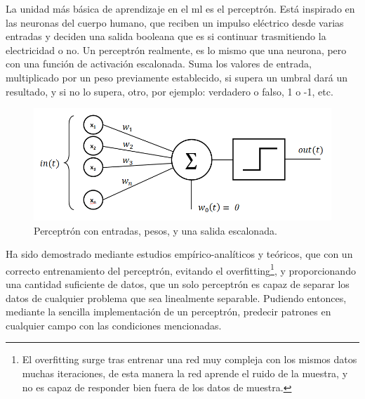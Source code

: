 La unidad más básica de aprendizaje en el \gls{ml} es el perceptrón. Está inspirado en las neuronas del cuerpo humano, que reciben un impulso eléctrico desde varias entradas y deciden una salida booleana que es si continuar trasmitiendo la electricidad o no. 
Un perceptrón realmente, es lo mismo que una neurona, pero con una función de activación escalonada. Suma los valores de entrada, multiplicado por un peso previamente establecido, si supera un umbral dará un resultado, y si no lo supera, otro, por ejemplo: verdadero o falso, 1 o -1, etc.

\begin{figure}[h]
	\centering
	\includegraphics[width=15cm]{archivos/imagenes/perceptron.png}
	\caption[Perceptrón con entradas, pesos, y una salida escalonada.]{Perceptrón con entradas, pesos, y una salida escalonada\footnotemark.}
	\label{perceptron}
\end{figure}

Ha sido demostrado mediante estudios empírico-analíticos y teóricos, que con un correcto entrenamiento del perceptrón, evitando el overfitting\footnote{El overfitting surge tras entrenar una red muy compleja con los mismos datos muchas iteraciones, de esta manera la red aprende el ruido de la muestra, y no es capaz de responder bien fuera de los datos de muestra.}, y proporcionando una cantidad suficiente de datos, que un solo perceptrón es capaz de separar los datos de cualquier problema que sea linealmente separable. Pudiendo entonces, mediante la sencilla implementación de un perceptrón, predecir patrones en cualquier campo con las condiciones mencionadas.


